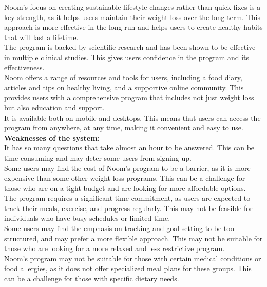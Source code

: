 \documentclass {article}
\begin{document}
\noindent Noom’s focus on creating sustainable lifestyle changes rather than quick fixes is a key strength, as it helps users maintain their weight loss over the long term. This approach is more effective in the long run and helps users to create healthy habits that will last a lifetime.\\

\noindent The program is backed by scientific research and has been shown to be effective in multiple clinical studies. This gives users confidence in the program and its effectiveness.\\

\noindent Noom offers a range of resources and tools for users, including a food diary, articles and tips on healthy living, and a supportive online community. This provides users with a comprehensive program that includes not just weight loss but also education and support.\\

\noindent It is available both on mobile and desktops. This means that users can access the program from anywhere, at any time, making it convenient and easy to use.\\

\noindent \textbf{Weaknesses of the system: \\}
\noindent It has so many questions that take almost an hour to be answered. This can be time-consuming and may deter some users from signing up.\\

\noindent Some users may find the cost of Noom’s program to be a barrier, as it is more expensive than some other weight loss programs. This can be a challenge for those who are on a tight budget and are looking for more affordable options.\\

\noindent The program requires a significant time commitment, as users are expected to track their meals, exercise, and progress regularly. This may not be feasible for individuals who have busy schedules or limited time.\\

\noindent Some users may find the emphasis on tracking and goal setting to be too structured, and may prefer a more flexible approach. This may not be suitable for those who are looking for a more relaxed and less restrictive program.\\

\noindent Noom’s program may not be suitable for those with certain medical conditions or food allergies, as it does not offer specialized meal plans for these groups. This can be a challenge for those with specific dietary needs.\\
\end{document}
